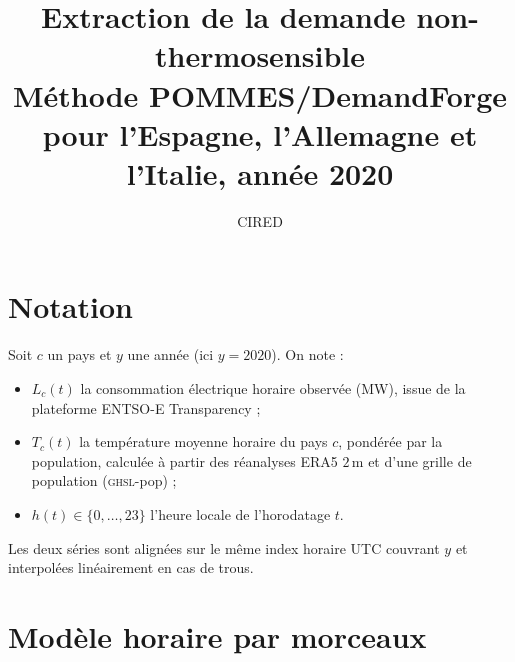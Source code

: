 \documentclass[11pt,a4paper]{article}
\title{Extraction de la demande non-thermosensible\\
\large M\'ethode POMMES/DemandForge pour l'Espagne, l'Allemagne et l'Italie, ann\'ee 2020}
\author{CIRED}
\date{}
\begin{document}
\maketitle

\section{Notation}

Soit $c$ un pays et $y$ une ann\'ee (ici $y=2020$). On note :
\begin{itemize}
  \item $L_c(t)$ la consommation \'electrique horaire observ\'ee (MW), issue de la plateforme ENTSO-E Transparency ;
  \item $T_c(t)$ la temp\'erature moyenne horaire du pays $c$, pond\'er\'ee par la population, calcul\'ee \`a partir des r\'eanalyses ERA5 $2\,\mathrm{m}$ et d'une grille de population (\textsc{ghsl}-pop) ;
  \item $h(t) \in \{0,\ldots,23\}$ l'heure locale de l'horodatage $t$.
\end{itemize}
Les deux s\'eries sont align\'ees sur le m\^eme index horaire UTC couvrant $y$ et interpol\'ees lin\'eairement en cas de trous.

\section{Mod\`ele horaire par morceaux}
\label{sec:model}
\end{document}
